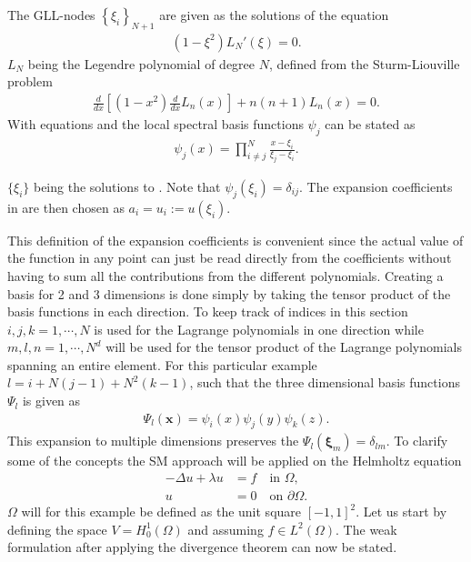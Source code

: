 The GLL-nodes $\left\{ \xi_i \right\}_{N+1}$ are given as the solutions of the equation 
\begin{align}
    (1-\xi^2)L_N'(\xi) = 0.
    \label{eq:GLL-nodes}
\end{align}
$L_N$ being the Legendre polynomial of degree $N$, defined from the Sturm-Liouville problem
\begin{align}
    \frac{d}{dx}\left[  (1-x^2)\frac{d}{dx}L_n(x)\right]+n(n+1)L_n(x) = 0.
    \label{eq:Legendre}
\end{align}
With equations  and  the local spectral 
basis functions $\psi_j$ can be stated as 
\begin{align}
    \psi_j(x) = \prod_{i\neq j}^{N}\frac{x-\xi_i}{\xi_j-\xi_i}.
    \label{eq:Lagrange}
\end{align}

$\{\xi_i\}$ being the solutions to . Note that $\psi_j(\xi_i) = \delta_{ij}$.
The expansion coefficients in  are then chosen as $a_i = u_i :=u(\xi_i)$. 

This definition of the expansion coefficients is convenient since the actual value of 
the function in any point can just be read directly from the coefficients without having to 
sum all the contributions from the different polynomials.
Creating a basis for 2 and 3 dimensions is done simply by taking the tensor product 
of the basis functions in each direction. To keep track of indices in this section
$i,j,k = 1,\cdots,N$ is used for the Lagrange polynomials in one direction 
while $m,l,n = 1,\cdots,N^d$ will be used for the tensor product
of the Lagrange polynomials spanning an entire element.
For this particular example $l = i+N(j-1)+N^{2}(k-1)$,
such that the three dimensional basis functions $\Psi_{l}$ is given as 
\begin{align}
    \Psi_{l}(\mathbf{x}) = \psi_i(x)\psi_j(y)\psi_k(z).
    \label{eq:3dbasis}
\end{align}
This expansion to multiple dimensions preserves the $\Psi_l(\boldsymbol\xi_m) = \delta_{lm}$.
To clarify some of the concepts the SM approach will be applied on the Helmholtz equation
%
\begin{align}
    -\Delta u + \lambda u &= f \quad \text{in } \Omega, \\
    u &= 0 \quad \text{on } \partial \Omega.
    \label{eq:Helmholtz}
\end{align}
%
$\Omega$ will for this example be defined as the unit square $[-1,1]^2$. 
Let us start by defining the space $V =H^1_0(\Omega)$ and assuming $f\in L^2(\Omega)$. 
The weak formulation after applying the divergence theorem can now be stated.

